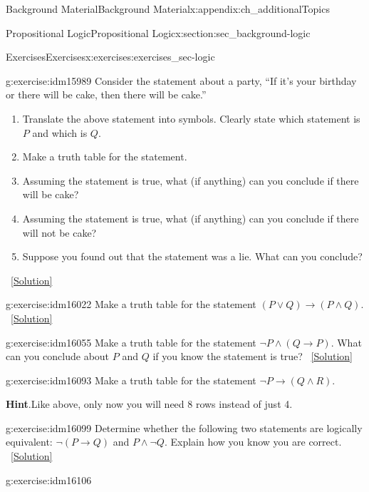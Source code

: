 \documentclass[oneside,10pt,]{book}
\numberwithin{equation}{chapter}
\def\imp{\rightarrow}
\begin{document}
\begin{appendixptx}{Background Material}{}{Background Material}{}{}{x:appendix:ch_additionalTopics}
\begin{sectionptx}{Propositional Logic}{}{Propositional Logic}{}{}{x:section:sec_background-logic}
\begin{exercises-subsection}{Exercises}{}{Exercises}{}{}{x:exercises:exercises_sec-logic}
\begin{divisionexercise}{1}{}{}{g:exercise:idm15989}
Consider the statement about a party, ``If it's your birthday or there will be cake, then there will be cake.''%
\par
%
\begin{enumerate}[label=(\alph*)]
\item{}Translate the above statement into symbols. Clearly state which statement is \(P\) and which is \(Q\).%
\item{}Make a truth table for the statement.%
\item{}Assuming the statement is true, what (if anything) can you conclude if there will be cake?%
\item{}Assuming the statement is true, what (if anything) can you conclude if there will not be cake?%
\item{}Suppose you found out that the statement was a lie. What can you conclude?%
\end{enumerate}
%
\qquad~\hfill{\tiny\hyperlink{g:solution:idm16007-main}{[Solution]}}\end{divisionexercise}%
\begin{divisionexercise}{2}{}{}{g:exercise:idm16022}%
Make a truth table for the statement \((P \vee Q) \imp (P \wedge Q)\).%
\qquad~\hfill{\tiny\hyperlink{g:solution:idm16026-main}{[Solution]}}\end{divisionexercise}%
\begin{divisionexercise}{3}{}{}{g:exercise:idm16055}%
Make a truth table for the statement \(\neg P \wedge (Q \imp P)\). What can you conclude about \(P\) and \(Q\) if you know the statement is true?%
\qquad~\hfill{\tiny\hyperlink{g:solution:idm16061-main}{[Solution]}}\end{divisionexercise}%
\begin{divisionexercise}{4}{}{}{g:exercise:idm16093}%
Make a truth table for the statement \(\neg P \imp (Q \wedge R)\).%
\par\smallskip%
\noindent\textbf{Hint}.\hypertarget{g:hint:idm16097}{}\quad{}Like above, only now you will need 8 rows instead of just 4.%
\end{divisionexercise}%
\begin{divisionexercise}{5}{}{}{g:exercise:idm16099}%
Determine whether the following two statements are logically equivalent:  \(\neg(P \imp Q)\) and \(P \wedge \neg Q\). Explain how you know you are correct.%
\qquad~\hfill{\tiny\hyperlink{g:solution:idm16104-main}{[Solution]}}\end{divisionexercise}%
\begin{divisionexercise}{6}{}{}{g:exercise:idm16106}%

\end{divisionexercise}
\end{exercises-subsection}
\end{sectionptx}
\end{appendixptx}
\end{document}
